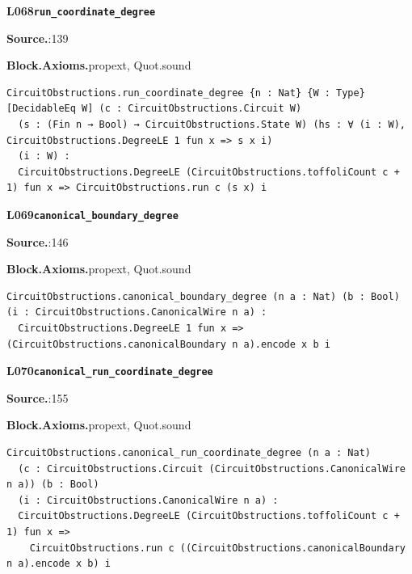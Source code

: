 \par\medskip\noindent\begin{minipage}{\textwidth}
{\small\bfseries L068\enspace\texttt{run\_coordinate\_degree}\par}
{\footnotesize\raggedright\textbf{Source.}\enspace{}:139\par
\textbf{Block.}\quad\textbf{Axioms.}\enspace propext, Quot.sound\par}\nopagebreak
\begin{lstlisting}
CircuitObstructions.run_coordinate_degree {n : Nat} {W : Type} [DecidableEq W] (c : CircuitObstructions.Circuit W)
  (s : (Fin n → Bool) → CircuitObstructions.State W) (hs : ∀ (i : W), CircuitObstructions.DegreeLE 1 fun x => s x i)
  (i : W) :
  CircuitObstructions.DegreeLE (CircuitObstructions.toffoliCount c + 1) fun x => CircuitObstructions.run c (s x) i
\end{lstlisting}
\end{minipage}\par

\par\medskip\noindent\begin{minipage}{\textwidth}
{\small\bfseries L069\enspace\texttt{canonical\_boundary\_degree}\par}
{\footnotesize\raggedright\textbf{Source.}\enspace{}:146\par
\textbf{Block.}\quad\textbf{Axioms.}\enspace propext, Quot.sound\par}\nopagebreak
\begin{lstlisting}
CircuitObstructions.canonical_boundary_degree (n a : Nat) (b : Bool) (i : CircuitObstructions.CanonicalWire n a) :
  CircuitObstructions.DegreeLE 1 fun x => (CircuitObstructions.canonicalBoundary n a).encode x b i
\end{lstlisting}
\end{minipage}\par

\par\medskip\noindent\begin{minipage}{\textwidth}
{\small\bfseries L070\enspace\texttt{canonical\_run\_coordinate\_degree}\par}
{\footnotesize\raggedright\textbf{Source.}\enspace{}:155\par
\textbf{Block.}\quad\textbf{Axioms.}\enspace propext, Quot.sound\par}\nopagebreak
\begin{lstlisting}
CircuitObstructions.canonical_run_coordinate_degree (n a : Nat)
  (c : CircuitObstructions.Circuit (CircuitObstructions.CanonicalWire n a)) (b : Bool)
  (i : CircuitObstructions.CanonicalWire n a) :
  CircuitObstructions.DegreeLE (CircuitObstructions.toffoliCount c + 1) fun x =>
    CircuitObstructions.run c ((CircuitObstructions.canonicalBoundary n a).encode x b) i
\end{lstlisting}
\end{minipage}\par

